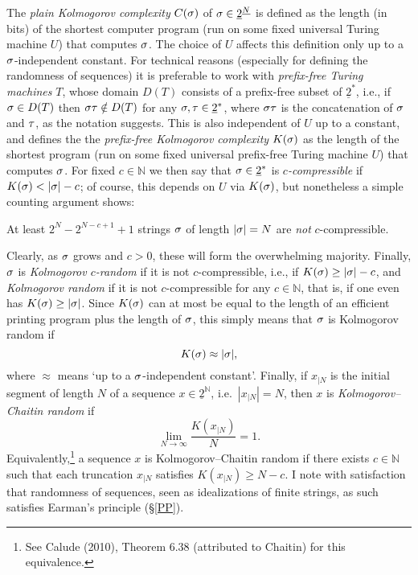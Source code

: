 \documentclass[11pt,a4paper]{article}
\numberwithin{equation}{section}
\newcommand{\beq}{\begin{equation}}
\newcommand{\eeq}{\end{equation}}
\newcommand{\ul}{\underline}
\newcommand{\raw}{\rightarrow}
\newcommand{\N}{{\mathbb N}} \newcommand{\R}{{\mathbb R}}
\begin{document}
The \emph{plain Kolmogorov complexity}  $C(\sigma)$ of $\sg\in \ul{2}^{\ul{N}}$ is defined as the length (in bits) of the shortest computer program (run on some fixed universal Turing machine $U$) that computes $\sigma$. The choice of $U$ affects this definition only up to a $\sigma$-independent constant. For technical reasons (especially for defining the randomness of sequences) it is preferable to work with \emph{prefix-free Turing machines} $T$, whose domain $D(T)$ consists of a prefix-free subset of $\ul{2}^*$, i.e., if $\sigma\in D(T)$ then $\sigma\tau\notin D(T)$ for any $\sg,\ta\in \ul{2}^*$, where $\sigma\tau$ is  the concatenation of $\sigma$ and $\tau$, as the notation suggests. This is also independent of $U$ up to a constant, and defines the
the \emph{prefix-free Kolmogorov complexity} $K(\sigma)$ as  the length of the shortest  program (run on some fixed universal prefix-free Turing machine $U$) that computes $\sigma$. 
For fixed  $c\in\N$ we then say that $\sg\in \ul{2}^*$ is \emph{$c$-compressible} if $K(\sg)<|\sg|-c$; of course, this  depends on $U$ via $K(\sigma)$, but nonetheless a simple counting argument shows:
\begin{center}
 At least $2^N-2^{N-c+1}+1$ strings $\sigma$ of length $|\sigma|=N$ are 
\emph{not} $c$-compressible. 
\end{center}
Clearly, as $\sigma$ grows and $c>0$, these will form the overwhelming majority. Finally, $\sigma$ is
\emph{Kolmogorov $c$-random} if it is not  $c$-compressible, i.e., if $K(\sigma)\geq |\sigma|-c$, and 
\emph{Kolmogorov random} if it is not  $c$-compressible for any $c\in\N$, that is, if one even has $K(\sigma)\geq |\sigma|$. Since $K(\sigma)$ can at most be equal to the length of an efficient printing program plus the length of $\sigma$, this simply means that $\sigma$ is Kolmogorov random if 
\beq
K(\sg)\approx |\sg|,
\eeq
where  $\approx$ means `up to a $\sigma$-independent constant'. Finally, if $x_{|N}$ is the initial segment of length $N$ of 
a sequence $x\in\ul{2}^{\N}$, i.e.\  $|x_{|N}|=N$, then $x$ is  \emph{Kolmogorov--Chaitin random} if
\begin{equation}
\lim_{N\raw\infty} \frac{K(x_{|N})}{N}=1.\label{Calude}
\end{equation}
Equivalently,\footnote{See Calude (2010), Theorem 6.38 (attributed to Chaitin) for this equivalence.}
 a sequence $x$ is Kolmogorov--Chaitin random if there exists $c\in\N$ such that each truncation $x_{|N}$ 
satisfies   $K(x_{|N})\geq N - c$.  I note with satisfaction that randomness of sequences, seen as idealizations of finite strings, as such satisfies Earman's principle (\S\ref{PP}).
\end{document}
